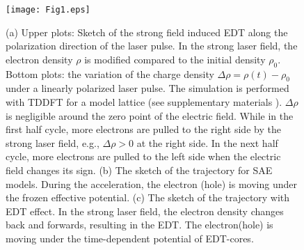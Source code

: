 \documentclass[aps,prl,10pt,preprint,nofootinbib]{revtex4-1}
\begin{document}
\begin{figure}[!t]
	\texttt{[image: Fig1.eps]}
	\caption{(a) Upper plots: Sketch of the strong field induced EDT along the polarization direction of the laser pulse. In the strong laser field, the electron density $\rho$ is modified compared to the initial density $\rho_0$. Bottom plots: the variation of the charge density $\Delta\rho=\rho(t)-\rho_{0}$ under a linearly polarized laser pulse. The simulation is performed with TDDFT for a model lattice (see supplementary materials \cite{SM}).  $\Delta\rho$ is negligible around the zero point of the electric field. While in the first half cycle, more electrons are pulled to the right side by the strong laser field, e.g., $\Delta\rho>0$ at the right side. In the next half cycle, more electrons are pulled to the left side when the electric field changes its sign. (b) The sketch of the trajectory for SAE models. During the acceleration, the electron (hole) is moving under the frozen effective potential. (c) The sketch of the trajectory with EDT effect. In the strong laser field, the electron density changes back and forwards, resulting in the EDT. The electron(hole) is moving under the time-dependent potential of EDT-cores.}\label{fig1}
\end{figure}
\end{document}
